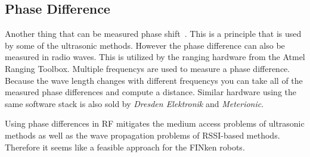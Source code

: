 \subsection{Phase Difference}

Another thing that can be measured phase shift~\cite{2_kluge_eggert_2009}.
This is a principle that is used by some of the ultrasonic methods.
However the phase difference can also be measured in radio waves.
This is utilized by the ranging hardware from the Atmel Ranging Toolbox.
Multiple frequencys are used to measure a phase difference.
Because the wave length changes with different frequencys you can take all of the measured phase differences and compute a distance.
Similar hardware using the same software stack is also sold by \emph{Dresden Elektronik} and \emph{Meterionic}.

Using phase differences in RF mitigates the medium access problems of ultrasonic methods as well as the wave propagation problems of RSSI-based methods.
Therefore it seems like a feasible approach for the FINken robots.

